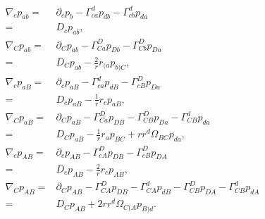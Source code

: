 \documentclass[12pt]{report}
\begin{document}
\begin{subequations}
\label{eq:first_der_metric_pert}
\begin{align}
    \nabla_{c}p_{ab}
    =&
    \partial_{c}p_{b}
    -
    \Gamma^{d}_{ca}p_{db}
    -
    \Gamma^{d}_{cb}p_{da}
    \nonumber\\
    =&
    D_cp_{ab}
    ,\\
    \nabla_Cp_{ab}
    =&
    \partial_{C}p_{ab}
    -
    \Gamma^{D}_{Ca}p_{Db}
    -
    \Gamma^{D}_{Cb}p_{Da}
    \nonumber\\
    =&
    D_Cp_{ab}
    -
    \frac{2}{r}r_{(a}p_{b)C}
    ,\\
    \nabla_cp_{aB}
    =&
    \partial_{c}p_{aB}
    -
    \Gamma^{d}_{ca}p_{dB}
    -
    \Gamma^{D}_{cB}p_{Da}
    \nonumber\\
    =&
    D_cp_{aB}
    -
    \frac{1}{r}r_cp_{aB}
    ,\\
    \nabla_Cp_{aB}
    =&
    \partial_{C}p_{aB}
    -
    \Gamma^{D}_{Ca}p_{DB}
    -
    \Gamma^{D}_{CB}p_{Da}
    -
    \Gamma^{d}_{CB}p_{da}
    \nonumber\\
    =&
    D_Cp_{aB}
    -
    \frac{1}{r}r_ap_{BC}
    +
    r r^d \Omega_{BC} p_{da}
    ,\\
    \nabla_cp_{AB}
    =&
    \partial_{c}p_{AB}
    -
    \Gamma^{D}_{cA}p_{DB}
    -
    \Gamma^{D}_{cB}p_{DA}
    \nonumber\\
    =&
    D_cp_{AB}
    -
    \frac{2}{r}r_cp_{AB}
    ,\\
    \nabla_Cp_{AB}
    =&
    \partial_{C}p_{AB}
    -
    \Gamma^{D}_{CA}p_{DB}
    -
    \Gamma^{d}_{CA}p_{dB}
    -
    \Gamma^{D}_{CB}p_{DA}
    -
    \Gamma^{d}_{CB}p_{dA}
    \nonumber\\
    =&
    D_{C}p_{AB}
    +
    2rr^d\Omega_{C(A}p_{B)d}
    .
\end{align}
\end{subequations}
\end{document}
